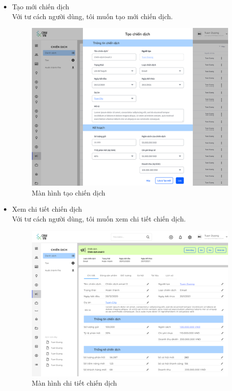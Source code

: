 \documentclass[12pt,a4paper]{article}
\begin{document}
\begin{enumerate}
\begin{itemize}
            \item Tạo mới chiến dịch \\
            Với tư cách người dùng, tôi muốn tạo mới chiến dịch.


            \begin{figure}[H]
                \centering \includegraphics[width=\textwidth]{Img/Nguyet/Chiendich/taochiendich.png}
                \vspace{0.5cm}
                \caption{Màn hình tạo chiến dịch }
                \label{taochiendich}
            \end{figure}

            \item Xem chi tiết chiến dịch \\
            Với tư cách người dùng, tôi muốn xem chi tiết chiến dịch.

            \begin{figure}[H]
                \centering \includegraphics[width=\textwidth]{Img/Nguyet/Chiendich/chitietcd.png}
                \vspace{0.5cm}
                \caption{Màn hình chi tiết chiến dịch }
                \label{chitietchiendich}
            \end{figure}


\end{itemize}
\end{enumerate}
\end{document}
